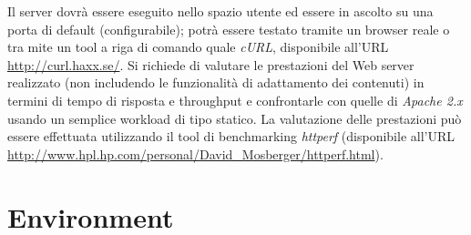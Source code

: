 \documentclass[a4paper, titlepage]{article}
\begin{document}
\begin{flushleft}
		Il server dovrà essere eseguito nello spazio utente ed essere in ascolto su una porta di default (configurabile); potrà essere testato tramite un browser reale o tra mite un tool a riga di comando quale \textit{cURL}, disponibile all’URL \url{http://curl.haxx.se/}.
		Si richiede di valutare le prestazioni del Web server realizzato (non includendo le funzionalità  di adattamento dei contenuti) in termini di tempo di risposta e throughput e confrontarle con quelle di \textit{Apache 2.x} usando un semplice workload di tipo statico. La valutazione delle prestazioni può essere effettuata utilizzando il tool di benchmarking \textit{httperf} (disponibile all’URL \url{http://www.hpl.hp.com/personal/David\_Mosberger/httperf.html}).
	\end{flushleft}
	
	\section{Environment}
\end{document}

